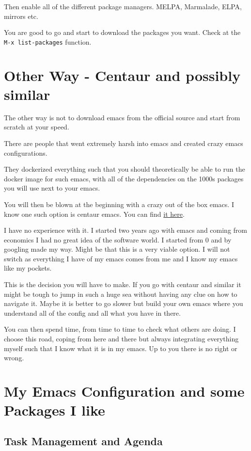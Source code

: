 \documentclass[a4paper]{article}
\begin{document}
Then enable all of the different package managers. MELPA, Marmalade,
ELPA, mirrors etc.

You are good to go and start to download the packages you
want. Check at the \texttt{M-x list-packages} function.


\section{Other Way - Centaur and possibly similar}
\label{sec:orgde39d54}

The other way is not to download emacs from the official
source and start from scratch at your speed.

There are people that went extremely harsh into emacs and created
crazy emacs configurations.

They dockerized everything such that you should theoretically be
able to run the docker image for such emacs, with all of the
dependencies on the 1000s packages you will use next to your emacs.

You will then be blown at the beginning with a crazy out of the box
emacs. I know one such option is centaur emacs. You can find \href{https://github.com/danielcnorris/centaur-emacs}{it
here}.

I have no experience with it. I started two years ago with emacs and
coming from economics I had no great idea of the software world. I
started from 0 and by googling made my way. Might be that this is a
very viable option. I will not switch as everything I have of my
emacs comes from me and I know my emacs like my pockets.

This is the decision you will have to make. If you go with centaur
and similar it might be tough to jump in such a huge sea without
having any clue on how to navigate it. Maybe it is better to go
slower but build your own emacs where you understand all of the
config and all what you have in there.

You can then spend time, from time to time to check what others are
doing. I choose this road, coping from here and there but always
integrating everything myself such that I know what it is in my
emacs. Up to you there is no right or wrong.


\section{My Emacs Configuration and some Packages I like}
\label{sec:orge2057b7}

\subsection{Task Management and Agenda}
\label{sec:org08dd819}
\end{document}
